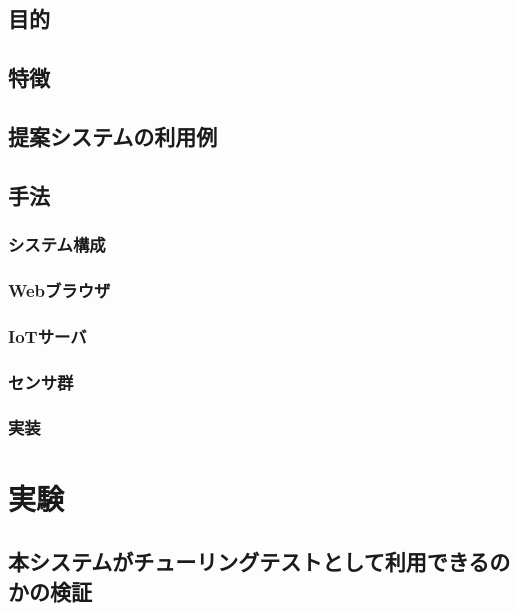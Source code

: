\subsection{目的}\label{ux76eeux7684-1}

\subsection{特徴}\label{ux7279ux5fb4}

\subsection{提案システムの利用例}\label{ux63d0ux6848ux30b7ux30b9ux30c6ux30e0ux306eux5229ux7528ux4f8b}

\subsection{手法}\label{ux624bux6cd5}

\subsubsection{システム構成}\label{ux30b7ux30b9ux30c6ux30e0ux69cbux6210}

\subsubsection{Webブラウザ}\label{webux30d6ux30e9ux30a6ux30b6}

\subsubsection{IoTサーバ}\label{iotux30b5ux30fcux30d0}

\subsubsection{センサ群}\label{ux30bbux30f3ux30b5ux7fa4}

\subsubsection{実装}\label{ux5b9fux88c5}

\section{実験}\label{ux5b9fux9a13}

\subsection{本システムがチューリングテストとして利用できるのかの検証}\label{ux672cux30b7ux30b9ux30c6ux30e0ux304cux30c1ux30e5ux30fcux30eaux30f3ux30b0ux30c6ux30b9ux30c8ux3068ux3057ux3066ux5229ux7528ux3067ux304dux308bux306eux304bux306eux691cux8a3c}

